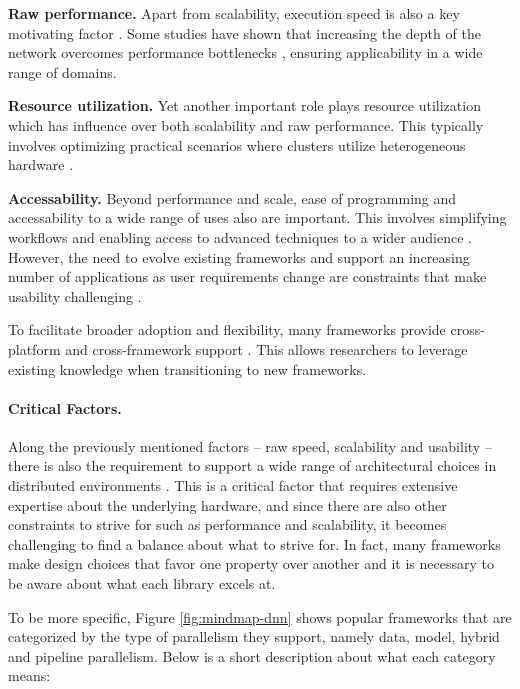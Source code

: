 \textbf{Raw performance.}
Apart from scalability, execution speed is also a key motivating factor
. Some studies have shown that increasing the depth of the network overcomes
performance bottlenecks , ensuring applicability in a wide range of domains.

\textbf{Resource utilization.}
Yet another important role plays resource utilization which has influence over both scalability and raw
performance. This typically involves optimizing practical scenarios where clusters utilize
heterogeneous hardware .

\textbf{Accessability.}
Beyond performance and scale, ease of programming and accessability to a wide range of uses also
are important. This involves simplifying workflows and enabling access to advanced techniques to a
wider audience . However, the need to evolve existing frameworks and
support an increasing number of applications as user requirements change are constraints that make
usability challenging .

To facilitate broader adoption and flexibility, many frameworks provide cross-platform and
cross-framework support . This allows researchers to leverage existing
knowledge when transitioning to new frameworks.

\paragraph{Critical Factors.}
Along the previously mentioned factors -- raw speed, scalability and usability -- there is also the
requirement to support a wide range of architectural choices in distributed environments
. This is a critical factor that requires extensive expertise about the underlying
hardware, and since there are also other constraints to strive for such as performance and
scalability, it becomes challenging to find a balance about what to strive for. In fact, many
frameworks make design choices that favor one property over another 
and it is necessary to be aware about what each library excels at.

To be more specific, Figure \ref{fig:mindmap-dnn} shows popular frameworks that are categorized by
the type of parallelism they support, namely data, model, hybrid and pipeline parallelism. Below is
a short description about what each category means:



